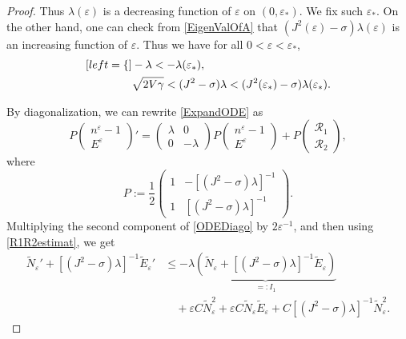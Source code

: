 \documentclass{amsart}
\newcommand{\veps}{\varepsilon}
\numberwithin{equation}{section}
\theoremstyle{plain}%
\theoremstyle{definition}
\theoremstyle{remark}
\theoremstyle{remark}
\begin{document}
\begin{proof}
Thus $\lambda(\veps)$ is a decreasing function of $\veps$ on $(0,\veps_\ast)$. We fix such $\veps_\ast$.  On the other hand, one can check from \eqref{EigenValOfA} that $(J^2(\veps) -\sigma)\lambda(\veps)$ is an increasing function of $\veps$. Thus we have for all $0<\veps<\veps_\ast$,
\begin{subequations}\label{BdEigenValue}
\begin{align}[left = \empheqlbrace\,]
& -\lambda < -\lambda(\veps_\ast),  \label{BdEigenValue1} \\
& \sqrt{2V\gamma} < (J^2-\sigma)\lambda  < (J^2(\veps_\ast)-\sigma)\lambda(\veps_\ast).\label{BdEigenvalue2}
\end{align}
\end{subequations}

By diagonalization, we can rewrite \eqref{ExpandODE} as
\begin{equation}\label{ODEDiago}
P\begin{pmatrix}
n^\veps-1 \\
E^\veps
\end{pmatrix}'
= \begin{pmatrix}
\lambda & 0 \\
0 & -\lambda
\end{pmatrix}
P\begin{pmatrix}
n^\veps-1 \\
E^\veps
\end{pmatrix} + P\begin{pmatrix}
\mathcal{R}_1 \\
\mathcal{R}_2
\end{pmatrix},
\end{equation}
where 
\[
P :=\frac{1}{2} \begin{pmatrix}
1 & -[(J^2-\sigma)\lambda]^{-1} \\
1 & [(J^2-\sigma)\lambda]^{-1}
\end{pmatrix}.
\]
Multiplying the second component of \eqref{ODEDiago} by $2\veps^{-1}$, and then using \eqref{R1R2estimat}, we get
\begin{equation}\label{RemainderExpand2}
\begin{split}
\widetilde{N}_\veps' + [(J^2-\sigma)\lambda]^{-1}\widetilde{E}_\veps' 
& \leq  -\lambda\underbrace{\left( \widetilde{N}_\veps + [(J^2-\sigma)\lambda]^{-1}\widetilde{E}_\veps \right)}_{=:I_1} \\
& \quad + \veps C \widetilde{N}_\veps^2 + \veps C \widetilde{N}_\veps \widetilde{E}_\veps +  C[(J^2-\sigma)\lambda]^{-1} \widetilde{N}_\veps^2.
 \end{split}

\end{equation}
\end{proof}
\end{document}
